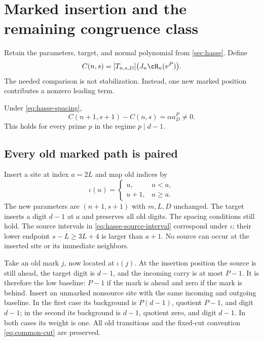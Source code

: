 \section{Marked insertion and the remaining congruence class}
\label{sec:insertion}

Retain the parameters, target, and normal polynomial from
\cref{sec:hasse}. Define
\begin{equation}
 C(n,s)=[T_{n,s,D}]\bigl(J_n\cH_n(v^P)\bigr).
 \label{eq:marked-coefficient}
\end{equation}
The needed comparison is not stabilization. Instead, one new
marked position contributes a nonzero leading term.

\begin{proposition}
\label{prop:marked-difference}
Under \eqref{eq:hasse-spacing},
\begin{equation}
 C(n+1,s+1)-C(n,s)=\alpha a_D^P\ne0.
 \label{eq:marked-difference}
\end{equation}
This holds for every prime $p$ in the regime $p\mid d-1$.
\end{proposition}

\subsection{Every old marked path is paired}

Insert a site at index $a=2L$ and map old indices by
\begin{equation}
 \iota(u)=\begin{cases}u,&u<a,\\u+1,&u\ge a.
 \end{cases}
 \label{eq:marked-insertion}
\end{equation}
The new parameters are $(n+1,s+1)$ with $m,L,D$ unchanged.
The target inserts a digit $d-1$ at $a$ and preserves all old
digits. The spacing conditions still hold. The source intervals
in \eqref{eq:hasse-source-interval} correspond under $\iota$;
their lower endpoint $s-L\ge3L+4$ is larger than $a+1$.
No source can occur at the inserted site or its immediate neighbors.

Take an old mark $j$, now located at $\iota(j)$. At the
insertion position the source is still ahead, the target digit
is $d-1$, and the incoming carry is at most $P-1$. It is
therefore the low baseline: $P-1$ if the mark is ahead and
zero if the mark is behind. Insert an unmarked nonsource site
with the same incoming and outgoing baseline. In the first case
its background is $P(d-1)$, quotient $P-1$, and digit $d-1$;
in the second its background is $d-1$, quotient zero, and
digit $d-1$. In both cases its weight is one.
All old transitions and the fixed-cut convention
\eqref{eq:common-cut} are preserved.

